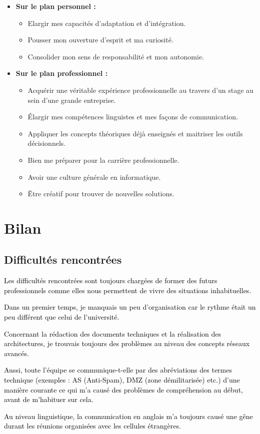 \documentclass[a4paper,12pt]{report}
\begin{document}
\begin{itemize}
	\item \textbf{Sur le plan personnel :} 
	     \begin{itemize}
	      \item Elargir mes capacités d’adaptation et d’intégration. 
	      \item Pousser mon ouverture d’esprit et ma curiosité.
	      \item Consolider mon sens de responsabilité et mon autonomie.
	     \end{itemize}
	     
    \item \textbf{Sur le plan professionnel :} 
	     \begin{itemize}
	      \item Acquérir une véritable expérience professionnelle au travers d’un stage au sein d’une grande entreprise. 
	      \item Élargir mes compétences linguistes et mes façons de communication.
	      \item Appliquer les concepts théoriques déjà enseignés et maitriser les outils décisionnels.
	      \item Bien me préparer pour la carrière professionnelle.
	      \item Avoir une culture générale en informatique.
	      \item Être créatif pour trouver de nouvelles solutions.
	     \end{itemize}
\end{itemize}


\chapter{Bilan}
\vspace{-1cm}
\section{Difficultés rencontrées}

\textcolor{black}{Les difficultés rencontrées sont toujours chargées de former des futurs professionnels comme elles nous permettent de vivre des situations inhabituelles.

Dans un premier temps, je manquais un peu d'organisation car le rythme était un peu différent que celui de l'université. 

Concernant la rédaction des documents techniques et la réalisation des architectures, je trouvais toujours des problèmes au niveau des concepts réseaux avancés.

Aussi, toute l'équipe se communique-t-elle par des abréviations des termes technique (exemples : AS (Anti-Spam), DMZ (zone démilitarisée) etc.) d'une manière courante ce qui m'a causé des problèmes de compréhension au début, avant de m'habituer sur cela.

Au niveau linguistique, la communication en anglais m'a toujours causé  une gêne durant les réunions organisées avec les cellules étrangères.
}
\end{document}
